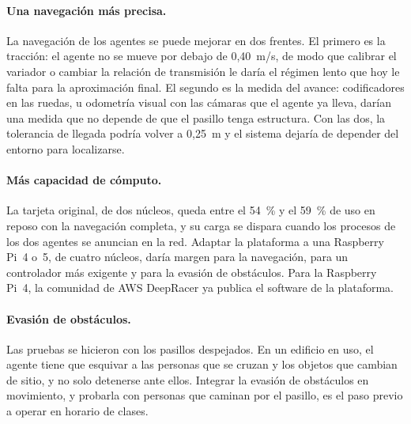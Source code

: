 %

\paragraph{Una navegación más precisa.} La navegación de los agentes se puede
mejorar en dos frentes. El primero es la tracción: el agente no se mueve por
debajo de 0,40~m/s, de modo que calibrar el variador o cambiar la relación de transmisión
le daría el régimen lento que hoy le falta para la aproximación final. El
segundo es la medida del avance: codificadores en las ruedas, u odometría visual
con las cámaras que el agente ya lleva, darían una medida que no depende de que
el pasillo tenga estructura. Con las dos, la tolerancia de llegada podría volver
a 0,25~m y el sistema dejaría de depender del entorno para localizarse.

\paragraph{Más capacidad de cómputo.} La tarjeta original, de dos núcleos,
queda entre el 54~\% y el 59~\% de uso en reposo con la navegación completa, y su
carga se dispara cuando los procesos de los dos agentes se anuncian en la red.
Adaptar la plataforma a una Raspberry Pi~4 o~5, de cuatro núcleos, daría margen
para la navegación, para un controlador más exigente y para la evasión de
obstáculos. Para la Raspberry Pi~4, la comunidad de AWS DeepRacer ya publica el
software de la plataforma.

\paragraph{Evasión de obstáculos.} Las pruebas se hicieron con los pasillos
despejados. En un edificio en uso, el agente tiene que esquivar a las personas
que se cruzan y los objetos que cambian de sitio, y no solo detenerse ante
ellos. Integrar la evasión de obstáculos en movimiento, y probarla con
personas que caminan por el pasillo, es el paso previo a operar en horario de
clases.

